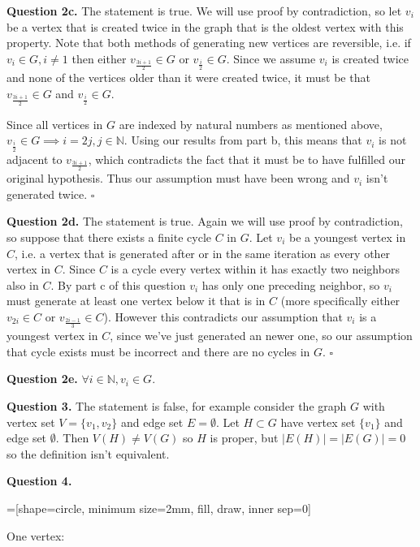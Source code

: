 \documentclass[letterpaper, reqno,11pt]{article}
\begin{document}
{\medskip\noindent\bf Question 2c.} The statement is true. We will use proof by contradiction, so let $v_i$ be a vertex that is created twice in the graph that is the oldest vertex with this property. Note that both methods of generating new vertices are reversible, i.e. if $v_i\in G, i\neq 1$ then either $v_{\frac{3i+1}{2}}\in G$ or $v_{\frac{i}{2}}\in G$. Since we assume $v_i$ is created twice and none of the vertices older than it were created twice, it must be that $v_{\frac{3i+1}{2}}\in G$ and $v_{\frac{i}{2}}\in G$. 

Since all vertices in $G$ are indexed by natural numbers as mentioned above, $v_{\frac{i}{2}}\in G \implies i=2j, j\in\mathbb{N}$. Using our results from part b, this means that $v_i$ is not adjacent to $v_{\frac{3i+1}{2}}$, which contradicts the fact that it must be to have fulfilled our original hypothesis. Thus our assumption must have been wrong and $v_i$ isn't generated twice. $\square$

{\medskip\noindent\bf Question 2d.} The statement is true. Again we will use proof by contradiction, so suppose that there exists a finite cycle $C$ in $G$. Let $v_i$ be a youngest vertex in $C$, i.e. a vertex that is generated after or in the same iteration as every other vertex in $C$. Since $C$ is a cycle every vertex within it has exactly two neighbors also in $C$. By part c of this question $v_i$ has only one preceding neighbor, so $v_i$ must generate at least one vertex below it that is in $C$ (more specifically either $v_{2i}\in C$ or $v_{\frac{2i-1}{3}}\in C$). However this contradicts our assumption that $v_i$ is a youngest vertex in $C$, since we've just generated an newer one, so our assumption that cycle exists must be incorrect and there are no cycles in $G$. $\square$

{\medskip\noindent\bf Question 2e.} $\forall i\in\mathbb{N}, v_i\in G$. 

{\medskip\noindent\bf Question 3.} The statement is false, for example consider the graph $G$ with vertex set $V=\{v_1, v_2\}$ and edge set $E=\emptyset$. Let $H\subset G$ have vertex set $\{v_1\}$ and edge set $\emptyset$. Then  $V(H)\neq V(G)$ so $H$ is proper, but $\left| E(H) \right| =\left| E(G) \right| =0$ so the definition isn't equivalent. 

{\medskip\noindent\bf Question 4.} 

=[shape=circle, minimum size=2mm, fill, draw, inner sep=0]

One vertex:

\begin{center}
\end{center}
\end{document}
